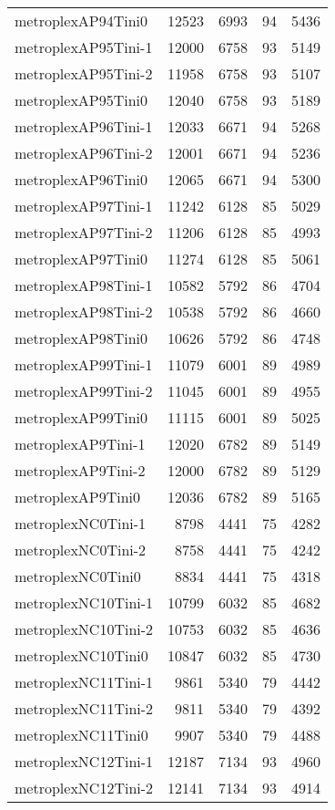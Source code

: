 \begin{longtable}{lrrrr}
metroplexAP94Tini0 & 12523 & 6993 & 94 & 5436 \\
metroplexAP95Tini-1 & 12000 & 6758 & 93 & 5149 \\
metroplexAP95Tini-2 & 11958 & 6758 & 93 & 5107 \\
metroplexAP95Tini0 & 12040 & 6758 & 93 & 5189 \\
metroplexAP96Tini-1 & 12033 & 6671 & 94 & 5268 \\
metroplexAP96Tini-2 & 12001 & 6671 & 94 & 5236 \\
metroplexAP96Tini0 & 12065 & 6671 & 94 & 5300 \\
metroplexAP97Tini-1 & 11242 & 6128 & 85 & 5029 \\
metroplexAP97Tini-2 & 11206 & 6128 & 85 & 4993 \\
metroplexAP97Tini0 & 11274 & 6128 & 85 & 5061 \\
metroplexAP98Tini-1 & 10582 & 5792 & 86 & 4704 \\
metroplexAP98Tini-2 & 10538 & 5792 & 86 & 4660 \\
metroplexAP98Tini0 & 10626 & 5792 & 86 & 4748 \\
metroplexAP99Tini-1 & 11079 & 6001 & 89 & 4989 \\
metroplexAP99Tini-2 & 11045 & 6001 & 89 & 4955 \\
metroplexAP99Tini0 & 11115 & 6001 & 89 & 5025 \\
metroplexAP9Tini-1 & 12020 & 6782 & 89 & 5149 \\
metroplexAP9Tini-2 & 12000 & 6782 & 89 & 5129 \\
metroplexAP9Tini0 & 12036 & 6782 & 89 & 5165 \\
metroplexNC0Tini-1 & 8798 & 4441 & 75 & 4282 \\
metroplexNC0Tini-2 & 8758 & 4441 & 75 & 4242 \\
metroplexNC0Tini0 & 8834 & 4441 & 75 & 4318 \\
metroplexNC10Tini-1 & 10799 & 6032 & 85 & 4682 \\
metroplexNC10Tini-2 & 10753 & 6032 & 85 & 4636 \\
metroplexNC10Tini0 & 10847 & 6032 & 85 & 4730 \\
metroplexNC11Tini-1 & 9861 & 5340 & 79 & 4442 \\
metroplexNC11Tini-2 & 9811 & 5340 & 79 & 4392 \\
metroplexNC11Tini0 & 9907 & 5340 & 79 & 4488 \\
metroplexNC12Tini-1 & 12187 & 7134 & 93 & 4960 \\
metroplexNC12Tini-2 & 12141 & 7134 & 93 & 4914 \\

\end{longtable}
